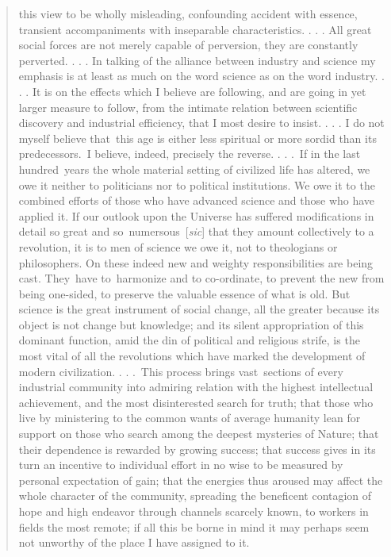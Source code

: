 \documentclass[twoside,symmetric,nobib,justified]{tufte-book}
\begin{document}
\begin{quote}
this view to be wholly misleading, confounding accident with essence,
transient accompaniments with inseparable characteristics. . . . All
great social forces are not merely capable of perversion, they are
constantly perverted. . . . In talking of the alliance between industry
and science my emphasis is at least as much on the word science as on
the word industry. . . . It is on the effects which I believe are
following, and are going in yet larger measure to follow, from the
intimate relation between scientific discovery and industrial
efficiency, that I most desire to insist. . . . I do not myself believe
that~this age is either less spiritual or more sordid than its
predecessors.~I believe, indeed, precisely the reverse. . . .~If in the
last hundred~years the whole material setting of civilized life has
altered, we owe it neither to politicians nor to political institutions.
We owe it to the combined efforts of those who have advanced science and
those who have applied it. If our outlook upon the Universe has suffered
modifications in detail so great and so~numersous~{[}\emph{sic}{]} that
they amount collectively to a revolution, it is to men of science we owe
it, not to theologians or philosophers. On these indeed new and weighty
responsibilities are being cast. They~have to~harmonize and to
co-ordinate, to prevent the new from being one-sided, to preserve the
valuable essence of what is old. But science is the great instrument of
social change, all the greater because its object is not change but
knowledge; and its silent appropriation of this dominant function, amid
the din of political and religious strife, is the most vital of all the
revolutions which have marked the development of modern civilization. .
. .~This process brings vast~sections of every industrial community into
admiring relation with the highest intellectual achievement, and the
most disinterested search for truth; that those who live by ministering
to the common wants of average humanity lean for support on those who
search among the deepest mysteries of Nature; that their dependence is
rewarded by growing success; that success gives in its turn an incentive
to individual effort in no wise to be measured by personal expectation
of gain; that the energies thus aroused may affect the whole character
of the community, spreading the beneficent contagion of hope and high
endeavor through channels scarcely known, to workers in fields the most
remote; if all this be borne in mind it may perhaps seem not unworthy of
the place I have assigned to it.~
\end{quote}
\end{document}
